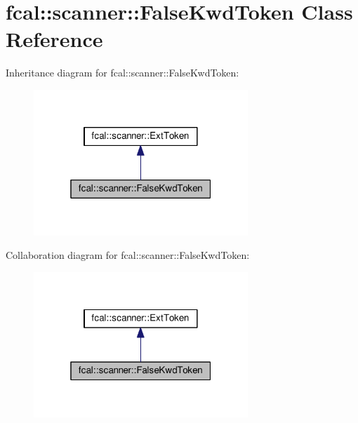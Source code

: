 \hypertarget{classfcal_1_1scanner_1_1FalseKwdToken}{}\section{fcal\+:\+:scanner\+:\+:False\+Kwd\+Token Class Reference}
\label{classfcal_1_1scanner_1_1FalseKwdToken}


Inheritance diagram for fcal\+:\+:scanner\+:\+:False\+Kwd\+Token\+:\nopagebreak
\begin{figure}[H]
\begin{center}
\leavevmode
\includegraphics[width=229pt]{classfcal_1_1scanner_1_1FalseKwdToken__inherit__graph}
\end{center}
\end{figure}


Collaboration diagram for fcal\+:\+:scanner\+:\+:False\+Kwd\+Token\+:\nopagebreak
\begin{figure}[H]
\begin{center}
\leavevmode
\includegraphics[width=229pt]{classfcal_1_1scanner_1_1FalseKwdToken__coll__graph}
\end{center}
\end{figure}
